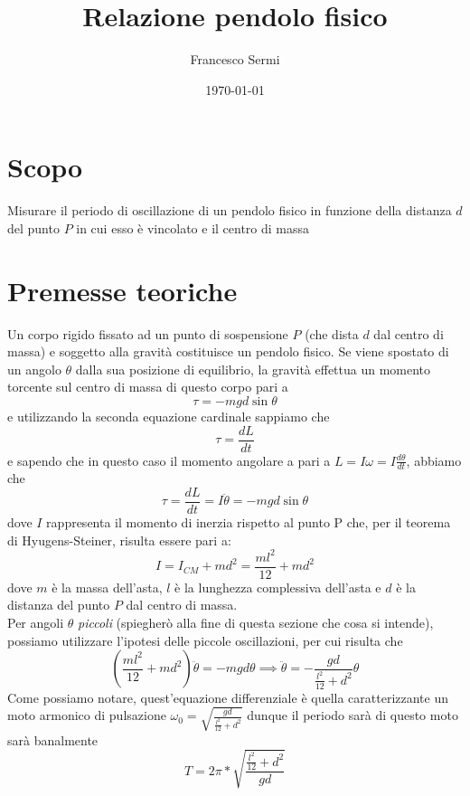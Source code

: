 \documentclass{article}
\title{Relazione pendolo fisico}
\author{Francesco Sermi}
\date{\today}
\begin{document}
	\maketitle
	\section{Scopo}
	Misurare il periodo di oscillazione di un pendolo fisico in funzione della distanza $d$ del punto $P$ in cui esso è vincolato e il centro di massa 
	\section{Premesse teoriche}
	Un corpo rigido fissato ad un punto di sospensione $P$ (che dista $d$ dal centro di massa) e soggetto alla gravità costituisce un pendolo fisico. Se viene spostato di un angolo $\theta$ dalla sua posizione di equilibrio, la gravità effettua un momento torcente sul centro di massa di questo corpo pari a
	$$
		\tau = -mgd\sin{\theta}
	$$
	e utilizzando la seconda equazione cardinale sappiamo che
	\begin{equation*}
		\tau = \frac{dL}{dt}
	\end{equation*}
	e sapendo che in questo caso il momento angolare a pari a $L = I\omega = I \frac{d\theta}{dt}$, abbiamo che
	\begin{equation*}
		\tau = \frac{dL}{dt} = I\ddot{\theta} = -mgd\sin{\theta}
	\end{equation*}
	dove $I$ rappresenta il momento di inerzia rispetto al punto P che, per il teorema di Hyugens-Steiner, risulta essere pari a:
	$$
		I = I_{CM} + md^2 = \frac{ml^2}{12} + md^2
	$$
	dove $m$ è la massa dell'asta, $l$ è la lunghezza complessiva dell'asta e $d$ è la distanza del punto $P$ dal centro di massa. \\
	Per angoli $\theta$ \emph{piccoli} (spiegherò alla fine di questa sezione che cosa si intende), possiamo utilizzare l'ipotesi delle piccole oscillazioni, per cui risulta che
	\begin{equation}
		\left( \frac{ml^2}{12} + md^2 \right) \ddot{\theta} = -mgd\theta \implies \ddot{\theta} = -\frac{gd}{\frac{l^2}{12} + d^2} \theta
	\end{equation}
	Come possiamo notare, quest'equazione differenziale è quella caratterizzante un moto armonico di pulsazione $\omega_0 = \sqrt{\frac{gd}{\frac{l^2}{12} + d^2}}$ dunque il periodo sarà di questo moto sarà banalmente
	\begin{equation}
		T = 2\pi * \sqrt{\frac{ \frac{l^2}{12} + d^2 }{gd}}
	\end{equation}
\end{document}
